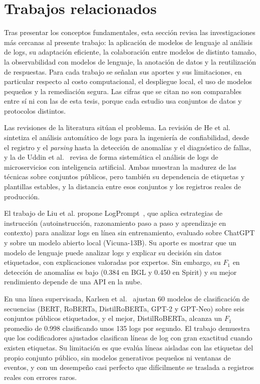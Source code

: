 \section{Trabajos relacionados}\label{cap:trabajos_relacionados}

Tras presentar los conceptos fundamentales, esta sección revisa las investigaciones más cercanas al presente trabajo: la aplicación de modelos de lenguaje al análisis de logs, su adaptación eficiente, la colaboración entre modelos de distinto tamaño, la observabilidad con modelos de lenguaje, la anotación de datos y la reutilización de respuestas. Para cada trabajo se señalan sus aportes y sus limitaciones, en particular respecto al costo computacional, el despliegue local, el uso de modelos pequeños y la remediación segura. Las cifras que se citan no son comparables entre sí ni con las de esta tesis, porque cada estudio usa conjuntos de datos y protocolos distintos.

Las revisiones de la literatura sitúan el problema. La revisión de He et al.~\cite{he2021_survey} sintetiza el análisis automático de logs para la ingeniería de confiabilidad, desde el registro y el \textit{parsing} hasta la detección de anomalías y el diagnóstico de fallas, y la de Uddin et al.~\cite{uddin2026_microservice_logs} revisa de forma sistemática el análisis de logs de microservicios con inteligencia artificial. Ambas muestran la madurez de las técnicas sobre conjuntos públicos, pero también su dependencia de etiquetas y plantillas estables, y la distancia entre esos conjuntos y los registros reales de producción.

El trabajo de Liu et al. propone LogPrompt~\cite{liu2024_logprompt}, que aplica estrategias de instrucción (autoinstrucción, razonamiento paso a paso y aprendizaje en contexto) para analizar logs en línea sin entrenamiento, evaluado sobre ChatGPT y sobre un modelo abierto local (Vicuna-13B). Su aporte es mostrar que un modelo de lenguaje puede analizar logs y explicar su decisión sin datos etiquetados, con explicaciones valoradas por expertos. Sin embargo, su $F_1$ en detección de anomalías es bajo (0.384 en BGL y 0.450 en Spirit) y su mejor rendimiento depende de una API en la nube.

En una línea supervisada, Karlsen et al.~\cite{karlsen2024_benchmark} ajustan 60 modelos de clasificación de secuencias (BERT, RoBERTa, DistilRoBERTa, GPT-2 y GPT-Neo) sobre seis conjuntos públicos etiquetados, y el mejor, DistilRoBERTa, alcanza un $F_1$ promedio de 0.998 clasificando unos 135 logs por segundo. El trabajo demuestra que los codificadores ajustados clasifican líneas de log con gran exactitud cuando existen etiquetas. Su limitación es que evalúa líneas aisladas con las etiquetas del propio conjunto público, sin modelos generativos pequeños ni ventanas de eventos, y con un desempeño casi perfecto que difícilmente se traslada a registros reales con errores raros.

